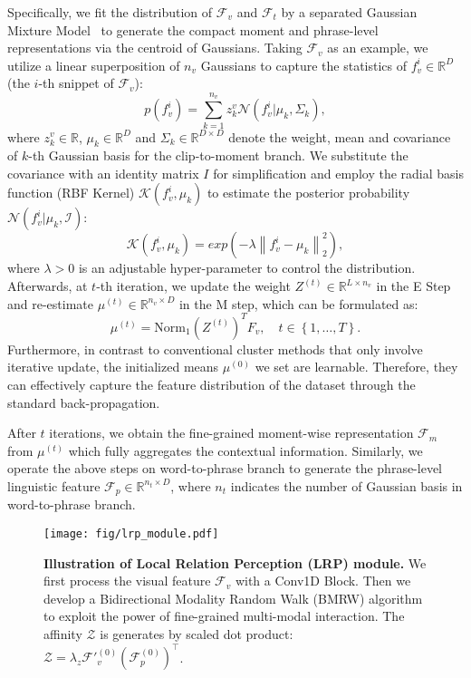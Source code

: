 Specifically, we fit the distribution of $\mathcal{F}_v$ and $\mathcal{F}_t$ by a separated Gaussian Mixture Model~\cite{gmm} to generate the compact moment and phrase-level representations via the centroid of Gaussians.
Taking $\mathcal{F}_v$ as an example,
we utilize a linear superposition of $n_v$ Gaussians to capture the statistics of $f_v^i \in \mathbb{R}^D$ (the $i$-th snippet of $\mathcal{F}_v$):
\begin{equation}
p(f_v^i)=\sum_{k=1}^{n_v} z_{k}^v\mathcal{N} (f_v^i|\mu_k, \Sigma _k),
\end{equation}
where $z_{k}^v \in \mathbb{R}$, $\mu_k \in \mathbb{R}^D$ and $\Sigma_k \in \mathbb{R}^{D\times D}$ denote the weight, mean and covariance of $k$-th Gaussian basis for the clip-to-moment branch.
We substitute the covariance with an identity matrix $I$ for simplification and employ the radial basis function (RBF Kernel) $\mathcal{K}(f_v^i,\mu_k)$ to estimate the posterior probability $\mathcal{N} (f_v^i|\mu _k, \mathcal{I} )$:
\begin{equation}
    \mathcal{K}(f_v^i,\mu_k) = exp(- \lambda \left \| f_v^i -\mu_k \right \| _2^2),
\end{equation}
where $\lambda > 0$ is an adjustable hyper-parameter to control the distribution.
Afterwards, at $t$-th iteration, we update the weight $Z^{(t)} \in \mathbb{R}^{L\times n_v}$ in the E Step and re-estimate $\mu^{(t)} \in \mathbb{R}^{n_v\times D}$ in the M step, which can be formulated as:
\begin{equation}
\label{t-step}
    \mu^{(t)} = \mathrm{Norm_1}(Z^{(t)})^TF_v,\quad t\in \left \{  1,\dots,T\right \}.
\end{equation}
Furthermore, in contrast to conventional cluster methods that only involve iterative update, the initialized means $\mu^{(0)}$ we set are learnable.
Therefore, they can effectively capture the feature distribution of the dataset through the standard back-propagation.

After $t$ iterations, we obtain the fine-grained moment-wise representation $\mathcal{F}_m$ from $\mu^{(t)}$ which fully aggregates the contextual information.
Similarly, we operate the above steps on word-to-phrase branch to generate the phrase-level linguistic feature $\mathcal{F}_p \in \mathbb{R}^{n_t \times D}$, where $n_t$ indicates the number of Gaussian basis in word-to-phrase branch. 

\begin{figure}
    \centering
    \texttt{[image: fig/lrp\_module.pdf]}
    \caption{\textbf{Illustration of Local Relation Perception (LRP) module.} We first process the visual feature $\mathcal{F}_v$ with a Conv1D Block. Then we develop a Bidirectional Modality Random Walk (BMRW) algorithm to exploit the power of fine-grained multi-modal interaction. The affinity $\mathcal{Z}$ is generates by scaled dot product: $\mathcal{Z}=\lambda_{z}\mathcal{F'}_v^{(0)} (\mathcal{F}_p^{(0)})^{\top }$.}
    \label{fig:lrp_module}
    \vspace{-10pt}
\end{figure}
\vspace{-10pt}
